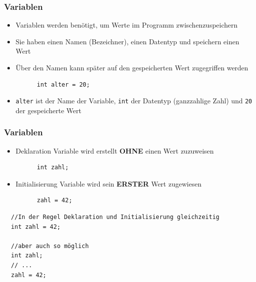\documentclass{../../presentation}
\begin{document}
\begin{frame}[fragile]
	\frametitle{Variablen}
	\pause
	\begin{itemize}
		\item Variablen werden benötigt, um Werte im Programm zwischenzuspeichern
		      \pause
		\item Sie haben einen Namen (Bezeichner), einen Datentyp und speichern einen Wert
		      \pause
		\item Über den Namen kann später auf den gespeicherten Wert zugegriffen werden
		      \pause
		      \begin{verbatim}
      int alter = 20;
    \end{verbatim}
		\item \texttt{alter} ist der Name der Variable, \texttt{int} der Datentyp (ganzzahlige Zahl) und \texttt{20} der gespeicherte Wert
	\end{itemize}
\end{frame}

\begin{frame}[fragile]
	\frametitle{Variablen}
	\pause
	\begin{itemize}
		\item Deklaration \quad \textrightarrow \quad Variable wird erstellt \textbf{OHNE} einen Wert zuzuweisen
		      \begin{verbatim}
      int zahl;
    \end{verbatim}
		      \pause
		\item Initialisierung \quad \textrightarrow \quad Variable wird sein \textbf{ERSTER} Wert zugewiesen
		      \begin{verbatim}
      zahl = 42;
    \end{verbatim}
		      \pause
	\end{itemize}
	\begin{verbatim}
  //In der Regel Deklaration und Initialisierung gleichzeitig
  int zahl = 42;

  //aber auch so möglich
  int zahl;
  // ...
  zahl = 42;
  \end{verbatim}
\end{frame}
\end{document}
